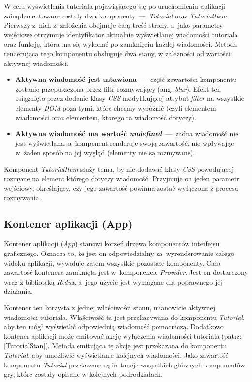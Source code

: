 \documentclass[12pt,a4paper,polish,thesis]{dcsbook}
\begin{document}
{	W celu wyświetlenia tutoriala pojawiąjącego się po uruchomieniu aplikacji zaimplementowane zostały dwa komponenty~---~\textit{Tutorial} oraz \textit{TutorialItem}. Pierwszy z~nich z~założenia obejmuje całą treść strony, a~jako parametry wejściowe otrzymuje identyfikator aktualnie wyświetlanej wiadomości tutoriala oraz funkcję, która ma się wykonać po zamknięciu każdej wiadomości. Metoda renderująca tego komponentu obsługuje dwa stany, w zależności od wartości aktywnej wiadomości. 
	\begin{itemize}
		\item \textbf{Aktywna wiadomość jest ustawiona}~---~część zawartości komponentu zostanie przepuszczona przez filtr rozmywający (ang. \textit{blur}). Efekt ten osiągnięto przez dodanie klasy \textit{CSS} modyfikującej atrybut \textit{filter} na wszystkie elementy \textit{DOM} poza tymi, które chcemy wyróżnić (czyli elementem wiadomości oraz elementem, którego ta wiadomość dotyczy).
		\item \textbf{Aktywna wiadomość ma wartość \textit{undefined}}~---~żadna wiadomość nie jest wyświetlana, a~komponent renderuje swoją zawartość, nie wpływając w~żaden sposób na jej wygląd (elementy nie są rozmywane).
	\end{itemize}
	Komponent \textit{TutorialItem} służy temu, by nie dodawać klasy \textit{CSS} powodującej rozmycie na element którego dotyczy wiadomość. Przyjmuje on jeden parametr wejściowy, określający, czy jego zawartość powinna zostać wyłączona z procesu rozmywania.

	\subsection{Kontener aplikacji (App)}

	Kontener aplikacji (\textit{App}) stanowi korzeń drzewa komponentów interfejsu graficznego. Oznacza to, że jest on odpowiedzialny za~wyrenderowanie całego widoku aplikacji, wywołuje zatem wszystkie pozostałe komponenty. Cała zawartość kontenera zamknięta jest w~komponencie \textit{Provider}. Jest on dostarczony wraz z biblioteką \textit{Redux}, a~jego użycie jest wymagane dla poprawnego jej działania.

	Kontener ten korzysta z jednej właściwości stanu, mianowicie aktywnej wiadomości tutoriala. Właściwość ta jest przekazywana do komponentu \textit{Tutorial}, aby ten mógł wyświetlić odpowiednią wiadomość pomocniczą. Dodatkowo kontener aplikacji może emitować akcję wyłączenia wiadomości tutoriala (patrz: \ref{TutorialStan}). Metoda emitująca tę akcję jest przekazana do komponentu \textit{Tutorial}, aby umożliwić wyświetlanie kolejnych wiadomości. Jako zawartość komponentu \textit{Tutorial} przekazane są instancje wszystkich głównych komponentów gry, które zostały opisane w kolejnych podrodziałach.

}
\end{document}
